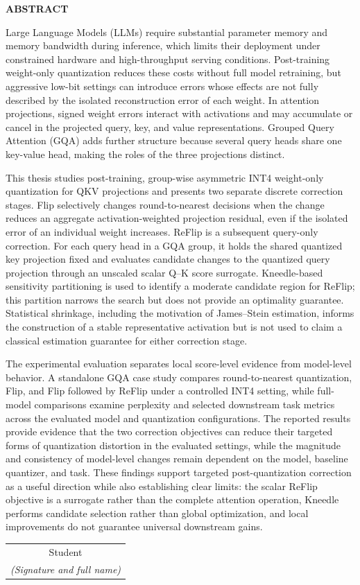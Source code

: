 \documentclass[../main.tex]{subfiles}
\begin{document}
\begin{center}
    \Large{\textbf{ABSTRACT}}\\
\end{center}
\vspace{1cm}
\sloppy

Large Language Models (LLMs) require substantial parameter memory and memory bandwidth during inference, which limits their deployment under constrained hardware and high-throughput serving conditions. Post-training weight-only quantization reduces these costs without full model retraining, but aggressive low-bit settings can introduce errors whose effects are not fully described by the isolated reconstruction error of each weight. In attention projections, signed weight errors interact with activations and may accumulate or cancel in the projected query, key, and value representations. Grouped Query Attention (GQA) adds further structure because several query heads share one key-value head, making the roles of the three projections distinct.

This thesis studies post-training, group-wise asymmetric INT4 weight-only quantization for QKV projections and presents two separate discrete correction stages. Flip selectively changes round-to-nearest decisions when the change reduces an aggregate activation-weighted projection residual, even if the isolated error of an individual weight increases. ReFlip is a subsequent query-only correction. For each query head in a GQA group, it holds the shared quantized key projection fixed and evaluates candidate changes to the quantized query projection through an unscaled scalar Q--K score surrogate. Kneedle-based sensitivity partitioning is used to identify a moderate candidate region for ReFlip; this partition narrows the search but does not provide an optimality guarantee. Statistical shrinkage, including the motivation of James--Stein estimation, informs the construction of a stable representative activation but is not used to claim a classical estimation guarantee for either correction stage.

The experimental evaluation separates local score-level evidence from model-level behavior. A standalone GQA case study compares round-to-nearest quantization, Flip, and Flip followed by ReFlip under a controlled INT4 setting, while full-model comparisons examine perplexity and selected downstream task metrics across the evaluated model and quantization configurations. The reported results provide evidence that the two correction objectives can reduce their targeted forms of quantization distortion in the evaluated settings, while the magnitude and consistency of model-level changes remain dependent on the model, baseline quantizer, and task. These findings support targeted post-quantization correction as a useful direction while also establishing clear limits: the scalar ReFlip objective is a surrogate rather than the complete attention operation, Kneedle performs candidate selection rather than global optimization, and local improvements do not guarantee universal downstream gains.

\begin{flushright}
\begin{tabular}{@{}c@{}}
Student\\
\textit{(Signature and full name)}
\end{tabular}
\end{flushright}
\end{document}
